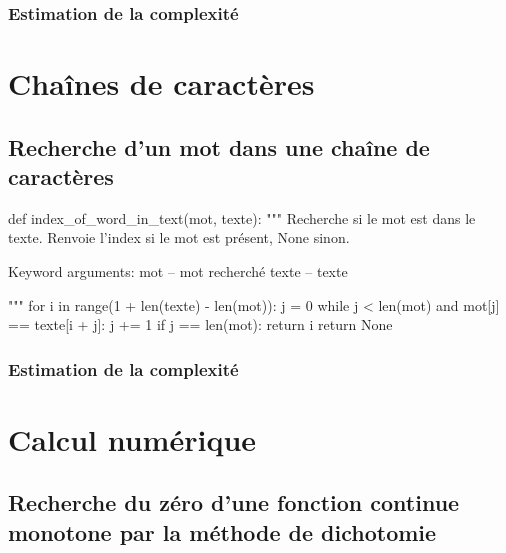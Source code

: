 \documentclass[10pt]{article}
\begin{document}
\subsubsection*{Estimation de la complexité}

\section{Chaînes de caractères}
\subsection{Recherche d'un mot dans une chaîne de caractères}

\begin{py}
\begin{python}
def index_of_word_in_text(mot, texte):
    """ Recherche si le mot est dans le texte.
    Renvoie l'index si le mot est présent, None sinon.
    
    Keyword arguments:
    mot -- mot recherché
    texte -- texte
    
    """
    for i in range(1 + len(texte) - len(mot)):
        j = 0
        while j < len(mot) and mot[j] == texte[i + j]:
            j += 1
        if j == len(mot):
            return i
    return None
\end{python}
\end{py}
\subsubsection*{Estimation de la complexité}

\section{Calcul numérique}
\subsection{Recherche du zéro d'une fonction continue monotone par la méthode de dichotomie}
\begin{pseudo}
\begin{algorithm}[H]
\end{algorithm}
\end{pseudo}
\end{document}
